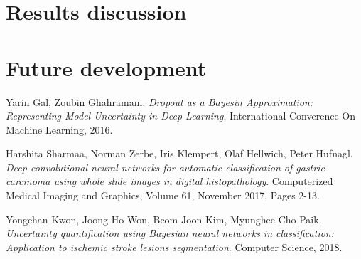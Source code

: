 \documentclass[12pt]{article}
\begin{document}
\section{Results discussion}
\section{Future development}
\newpage
\begin{thebibliography}{9}

	Yarin Gal, Zoubin Ghahramani.	\textit{Dropout as a Bayesin Approximation: Representing Model Uncertainty in Deep Learning}, International Converence On Machine Learning, 2016.

	Harshita Sharmaa, Norman Zerbe, Iris Klempert, Olaf Hellwich, Peter Hufnagl. \textit{Deep convolutional neural networks for automatic classification of gastric carcinoma using whole slide images in digital histopathology}. Computerized Medical Imaging and Graphics, Volume 61, November 2017, Pages 2-13.

	 Yongchan Kwon, Joong-Ho Won, Beom Joon Kim, Myunghee Cho Paik. \textit{Uncertainty quantification using Bayesian neural networks in classification: Application to ischemic stroke lesions segmentation}. Computer Science, 2018.


\end{thebibliography}
\end{document}
